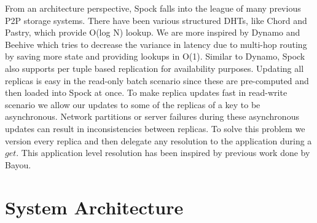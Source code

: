 \documentclass[twocolumn]{article}
\newcommand{\projectname}{Spock}
\begin{document}
From an architecture perspective, \projectname{} falls into the league of many previous P2P storage systems. There have been various structured DHTs, like Chord\cite{chord} and Pastry\cite{pastry}, which provide O(log N) lookup. We are more inspired by Dynamo and Beehive\cite{beehive} which tries to decrease the variance in latency due to multi-hop routing by saving more state and providing lookups in O(1). Similar to Dynamo, \projectname{} also supports per tuple based replication for availability purposes. Updating all replicas is easy in the read-only batch scenario since these are pre-computed and then loaded into \projectname{} at once. To make replica updates fast in read-write scenario we allow our updates to some of the replicas of a key to be asynchronous. Network partitions or server failures during these asynchronous updates can result in inconsistencies between replicas. To solve this problem we version every replica and then delegate any resolution to the application during a $get$. This application level resolution has been inspired by previous work done by Bayou\cite{bayou}. 


\section{System Architecture}
\label{sec:system_architecture}
\end{document}
